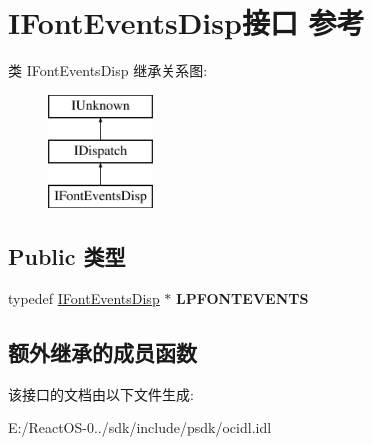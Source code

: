 \hypertarget{interface_i_font_events_disp}{}\section{I\+Font\+Events\+Disp接口 参考}
\label{interface_i_font_events_disp}
类 I\+Font\+Events\+Disp 继承关系图\+:\begin{figure}[H]
\begin{center}
\leavevmode
\includegraphics[height=3.000000cm]{interface_i_font_events_disp}
\end{center}
\end{figure}
\subsection*{Public 类型}
\begin{DoxyCompactItemize}
\item 
\mbox{\label{interface_i_font_events_disp_a00bcdd249c05f24ea44b34a649ff7cfb}} 
typedef \hyperlink{interface_i_font_events_disp}{I\+Font\+Events\+Disp} $\ast$ {\bfseries L\+P\+F\+O\+N\+T\+E\+V\+E\+N\+TS}
\end{DoxyCompactItemize}
\subsection*{额外继承的成员函数}


该接口的文档由以下文件生成\+:\begin{DoxyCompactItemize}
\item 
E\+:/\+React\+O\+S-\/0../sdk/include/psdk/ocidl.\+idl\end{DoxyCompactItemize}

